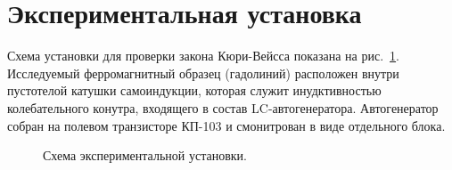 \documentclass[a4paper,12pt]{article} %
\begin{document}
\section{Экспериментальная установка}
	Схема установки для проверки закона Кюри-Вейсса показана на рис.~\ref{ris:ustanovka}. Исследуемый ферромагнитный образец (гадолиний) расположен внутри пустотелой катушки самоиндукции, которая служит инудктивностью колебательного конутра, входящего в состав LC-автогенератора. Автогенератор собран на полевом транзисторе КП-103 и смонитрован в виде отдельного блока.
	\begin{figure}[H]
		\caption{Схема экспериментальной установки.}
		\label{ris:ustanovka}
	\end{figure}
	
\end{document}
